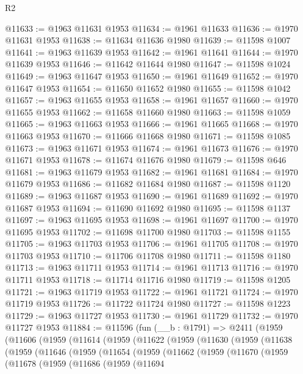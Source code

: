 \begin{lexlean}{R2}
\begin{coremodule}
@11633 := @1963 @11631 @1953
@11634 := @1961 @11633
@11636 := @1970 @11631 @1953
@11638 := @11634 @11636 @1980
@11639 := @11598 @1007
@11641 := @1963 @11639 @1953
@11642 := @1961 @11641
@11644 := @1970 @11639 @1953
@11646 := @11642 @11644 @1980
@11647 := @11598 @1024
@11649 := @1963 @11647 @1953
@11650 := @1961 @11649
@11652 := @1970 @11647 @1953
@11654 := @11650 @11652 @1980
@11655 := @11598 @1042
@11657 := @1963 @11655 @1953
@11658 := @1961 @11657
@11660 := @1970 @11655 @1953
@11662 := @11658 @11660 @1980
@11663 := @11598 @1059
@11665 := @1963 @11663 @1953
@11666 := @1961 @11665
@11668 := @1970 @11663 @1953
@11670 := @11666 @11668 @1980
@11671 := @11598 @1085
@11673 := @1963 @11671 @1953
@11674 := @1961 @11673
@11676 := @1970 @11671 @1953
@11678 := @11674 @11676 @1980
@11679 := @11598 @646
@11681 := @1963 @11679 @1953
@11682 := @1961 @11681
@11684 := @1970 @11679 @1953
@11686 := @11682 @11684 @1980
@11687 := @11598 @1120
@11689 := @1963 @11687 @1953
@11690 := @1961 @11689
@11692 := @1970 @11687 @1953
@11694 := @11690 @11692 @1980
@11695 := @11598 @1137
@11697 := @1963 @11695 @1953
@11698 := @1961 @11697
@11700 := @1970 @11695 @1953
@11702 := @11698 @11700 @1980
@11703 := @11598 @1155
@11705 := @1963 @11703 @1953
@11706 := @1961 @11705
@11708 := @1970 @11703 @1953
@11710 := @11706 @11708 @1980
@11711 := @11598 @1180
@11713 := @1963 @11711 @1953
@11714 := @1961 @11713
@11716 := @1970 @11711 @1953
@11718 := @11714 @11716 @1980
@11719 := @11598 @1205
@11721 := @1963 @11719 @1953
@11722 := @1961 @11721
@11724 := @1970 @11719 @1953
@11726 := @11722 @11724 @1980
@11727 := @11598 @1223
@11729 := @1963 @11727 @1953
@11730 := @1961 @11729
@11732 := @1970 @11727 @1953
@11884 := @11596
    (fun (__b : @1791) =>
    @2411
      (@1959
        (@11606
          (@1959
            (@11614
              (@1959
                (@11622
                  (@1959
                    (@11630
                      (@1959
                        (@11638
                          (@1959
                            (@11646
                              (@1959
                                (@11654
                                  (@1959
                                    (@11662
                                      (@1959
                                        (@11670
                                          (@1959
                                            (@11678
                                              (@1959
                                                (@11686
                                                  (@1959
                                                    (@11694

\end{coremodule}
\end{lexlean}
